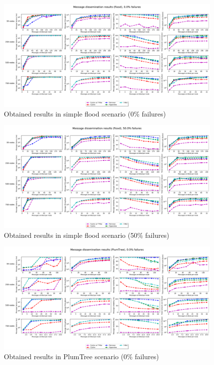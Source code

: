 \begin{landscape}

\begin{figure}[htbp]
    \centering
    \includegraphics[width=\columnwidth]{Chapters/evaluation/figures/flood/flood_0.0_failures.pdf}
    \caption{Obtained results in simple flood scenario (0\% failures)}
    \label{fig:pouchbeasts-overview}
\end{figure}

\begin{figure}[htbp]
    \centering
    \includegraphics[width=\columnwidth]{Chapters/evaluation/figures/flood/flood_50.0_failures.pdf}
    \caption{Obtained results in simple flood scenario (50\% failures)}
    \label{fig:pouchbeasts-overview}
\end{figure}

\begin{figure}[htbp]
    \centering
    \includegraphics[width=\columnwidth]{Chapters/evaluation/figures/flood/plumTree_0.0_failures.pdf}
    \caption{Obtained results in PlumTree scenario (0\% failures)}
    \label{fig:pouchbeasts-overview}
\end{figure}


\end{landscape}
